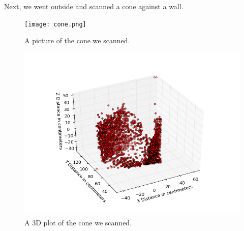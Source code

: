 \documentclass{article}
\begin{document}
\newpage

Next, we went outside and scanned a cone against a wall. 

\begin{figure}[h!]
\begin{center}
\texttt{[image: cone.png]}
\caption{A picture of the cone we scanned.}
\end{center}
\end{figure}

\begin{figure}[h!]
\begin{center}
\includegraphics[scale=0.8]{cone_scan.png}
\caption{A 3D plot of the cone we scanned.}
\end{center}
\end{figure}
\end{document}
